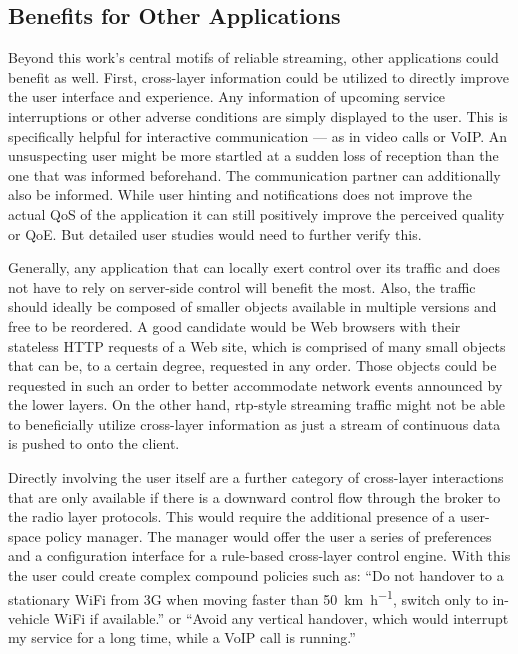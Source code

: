 \subsection{Benefits for Other Applications}

Beyond this work's central motifs of reliable streaming, other applications could benefit as well. First, cross-layer information could be utilized to directly improve the user interface and experience. Any information of upcoming service interruptions or other adverse conditions are simply displayed to the user. This is specifically helpful for interactive communication --- as in video calls or \gls{VoIP}. An unsuspecting user might be more startled at a sudden loss of reception than the one that was informed beforehand. The communication partner can additionally also be informed. While user hinting and notifications does not improve the actual \gls{QoS} of the application it can still positively improve the perceived quality or \gls{QoE}. But detailed user studies would need to further verify this.

Generally, any application that can locally exert control over its traffic and does not have to rely on server-side control will benefit the most. Also, the traffic should ideally be composed of smaller objects available in multiple versions and free to be reordered. A good candidate would be Web browsers with their stateless \gls{HTTP} requests of a Web site, which is comprised of many small objects that can be, to a certain degree, requested in any order. Those objects could be requested in such an order to better accommodate network events announced by the lower layers. On the other hand, \gls{rtp}-style streaming traffic might not be able to beneficially utilize cross-layer information as just a stream of continuous data is pushed to onto the client.

Directly involving the user itself are a further category of cross-layer interactions that are only available if there is a downward control flow through the broker to the radio layer protocols. This would require the additional presence of a user-space policy manager. The manager would offer the user a series of preferences and a configuration interface for a rule-based cross-layer control engine. With this the user could create complex compound policies such as: ``Do not handover to a stationary WiFi from \gls{3G} when moving faster than \SI{50}{\kilo\meter\per\hour}, switch only to in-vehicle WiFi if available.'' or ``Avoid any vertical handover, which would interrupt my service for a long time, while a \acrshort{VoIP} call is running.''


